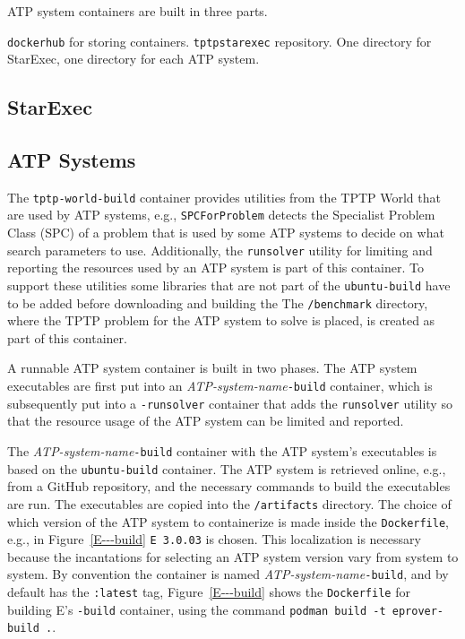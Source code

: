 \documentclass{easychair}
\begin{document}
ATP system containers are built in three parts.


{\tt dockerhub} for storing containers.
{\tt tptpstarexec} repository.
One directory for StarExec, one directory for each ATP system.

\subsection{StarExec}
\label{StarExec}

\subsection{ATP Systems}
\label{ATPSystems}

The {\tt tptp-world-build} container provides utilities from the TPTP World \cite{Sut24} that 
are used by ATP systems, e.g., {\tt SPCForProblem} detects the Specialist Problem Class (SPC) 
\cite{SS01} of a problem that is used by some ATP systems to decide on what search parameters 
to use.
Additionally, the {\tt runsolver} utility \cite{Rou11} for limiting and reporting the resources
used by an ATP system is part of this container.
To support these utilities some libraries that are not part of the {\tt ubuntu-build} have
to be added before downloading and building the 
The {\tt /benchmark} directory, where the TPTP problem for the ATP system to solve is placed, is
created as part of this container.

A runnable ATP system container is built in two phases.
The ATP system executables are first put into an {\em ATP-system-name}{\tt-build} container,
which is subsequently put into a {\tt -runsolver} container that adds the {\tt runsolver} utility 
so that the resource usage of the ATP system can be limited and reported.

The {\em ATP-system-name}{\tt-build} container with the ATP system's executables is based on the
{\tt ubuntu-build} container.
The ATP system is retrieved online, e.g., from a GitHub repository, and the necessary commands
to build the executables are run.
The executables are copied into the {\tt /artifacts} directory.
The choice of which version of the ATP system to containerize is made inside the {\tt Dockerfile},
e.g., in Figure~\ref{E---build} {\tt E 3.0.03} is chosen.
This localization is necessary because the incantations for selecting an ATP system version vary 
from system to system.
By convention the container is named {\em ATP-system-name}{\tt -build}, and by default has
the {\tt :latest} tag,
Figure~\ref{E---build} shows the {\tt Dockerfile} for building E's {\tt -build} container, using 
the command {\tt podman build -t eprover-build .}.
\end{document}
